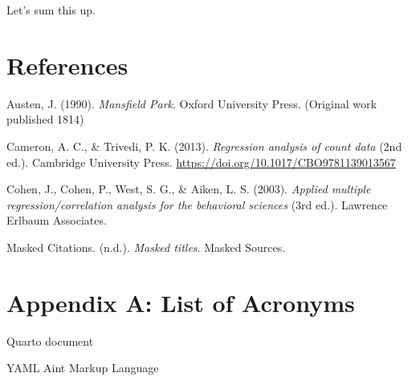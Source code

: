 \documentclass[
  man,
  floatsintext,
  longtable,
  colorlinks=true,linkcolor=blue,citecolor=blue,urlcolor=blue]{apa7}
\providecommand{\tightlist}{%
  \setlength{\itemsep}{0pt}\setlength{\parskip}{0pt}}
\newlength{\cslhangindent}
\newenvironment{CSLReferences}[2] %
 {\begin{list}{}{%
  \setlength{\itemindent}{0pt}
  \setlength{\leftmargin}{0pt}
  \setlength{\parsep}{0pt}
  \ifodd #1
   \setlength{\leftmargin}{\cslhangindent}
   \setlength{\itemindent}{-1\cslhangindent}
  \fi
  \setlength{\itemsep}{#2\baselineskip}}}
 {\end{list}}
\begin{document}
Let's sum this up.

\newpage

\section{References}\label{references}

\label{refs}
\begin{CSLReferences}{1}{0}
Austen, J. (1990). \emph{Mansfield {P}ark}. Oxford University Press.
(Original work published 1814)

Cameron, A. C., \& Trivedi, P. K. (2013). \emph{Regression analysis of
count data} (2nd ed.). Cambridge University Press.
\url{https://doi.org/10.1017/CBO9781139013567}

Cohen, J., Cohen, P., West, S. G., \& Aiken, L. S. (2003). \emph{Applied
multiple regression/correlation analysis for the behavioral sciences}
(3rd ed.). Lawrence Erlbaum Associates.

Masked Citations. (n.d.). \emph{Masked titles}. Masked Sources.

\end{CSLReferences}

\newpage

\section{Appendix A: List of
Acronyms}\label{appendix-a-list-of-acronyms}

\begin{description}
\tightlist
\item[\phantomsection\label{acronyms_qmd}{qmd}]
Quarto document
\item[\phantomsection\label{acronyms_YAML}{YAML}]
YAML Aint Markup Language
\end{description}
\end{document}
